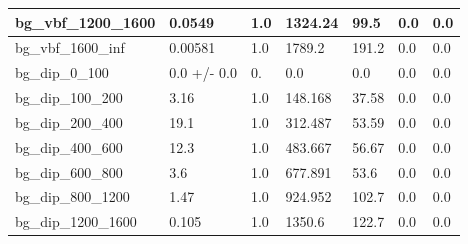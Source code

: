 \documentclass[a4paper, 10pt]{article}
\begin{document}
\begin{table}[H]
\begin{center}
\begin{tabular}{|m{23.0mm}|m{23.0mm}|m{18.0mm}|m{19.0mm}|m{19.0mm}|m{19.0mm}|m{19.0mm}|}
      \hline
      {\cellcolor{white}         bg\_vbf\_1200\_1600}& {\cellcolor{white}         0.0549}& {\cellcolor{white}         1.0}& {\cellcolor{white}         1324.24}& {\cellcolor{white}         99.5}& {\cellcolor{green}         0.0}& {\cellcolor{green}         0.0}\\
      \hline
      {\cellcolor{white}         bg\_vbf\_1600\_inf}& {\cellcolor{white}         0.00581}& {\cellcolor{white}         1.0}& {\cellcolor{white}         1789.2}& {\cellcolor{white}         191.2}& {\cellcolor{green}         0.0}& {\cellcolor{green}         0.0}\\
      \hline
      {\cellcolor{white}         bg\_dip\_0\_100}& {\cellcolor{white}         0.0 +/\-- 0.0}& {\cellcolor{white}         0.}& {\cellcolor{white}         0.0}& {\cellcolor{white}         0.0}& {\cellcolor{green}         0.0}& {\cellcolor{green}         0.0}\\
      \hline
      {\cellcolor{white}         bg\_dip\_100\_200}& {\cellcolor{white}         3.16}& {\cellcolor{white}         1.0}& {\cellcolor{white}         148.168}& {\cellcolor{white}         37.58}& {\cellcolor{green}         0.0}& {\cellcolor{green}         0.0}\\
      \hline
      {\cellcolor{white}         bg\_dip\_200\_400}& {\cellcolor{white}         19.1}& {\cellcolor{white}         1.0}& {\cellcolor{white}         312.487}& {\cellcolor{white}         53.59}& {\cellcolor{green}         0.0}& {\cellcolor{green}         0.0}\\
      \hline
      {\cellcolor{white}         bg\_dip\_400\_600}& {\cellcolor{white}         12.3}& {\cellcolor{white}         1.0}& {\cellcolor{white}         483.667}& {\cellcolor{white}         56.67}& {\cellcolor{green}         0.0}& {\cellcolor{green}         0.0}\\
      \hline
      {\cellcolor{white}         bg\_dip\_600\_800}& {\cellcolor{white}         3.6}& {\cellcolor{white}         1.0}& {\cellcolor{white}         677.891}& {\cellcolor{white}         53.6}& {\cellcolor{green}         0.0}& {\cellcolor{green}         0.0}\\
      \hline
      {\cellcolor{white}         bg\_dip\_800\_1200}& {\cellcolor{white}         1.47}& {\cellcolor{white}         1.0}& {\cellcolor{white}         924.952}& {\cellcolor{white}         102.7}& {\cellcolor{green}         0.0}& {\cellcolor{green}         0.0}\\
      \hline
      {\cellcolor{white}         bg\_dip\_1200\_1600}& {\cellcolor{white}         0.105}& {\cellcolor{white}         1.0}& {\cellcolor{white}         1350.6}& {\cellcolor{white}         122.7}& {\cellcolor{green}         0.0}& {\cellcolor{green}         0.0}\\

\end{tabular}
\end{center}
\end{table}
\end{document}
